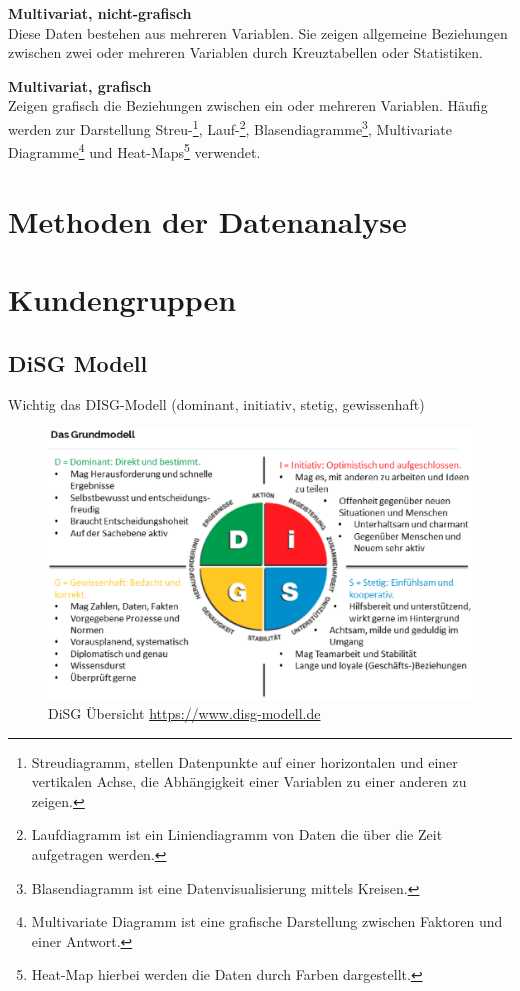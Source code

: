 \textbf{Multivariat, nicht-grafisch}\\
Diese Daten bestehen aus mehreren Variablen. Sie zeigen allgemeine Beziehungen zwischen zwei oder mehreren Variablen durch Kreuztabellen oder Statistiken.\vspace{0.2cm}
 
\textbf{Multivariat, grafisch}\\
Zeigen grafisch die Beziehungen zwischen ein oder mehreren Variablen. Häufig werden zur Darstellung Streu-\footnote{Streudiagramm, stellen Datenpunkte auf einer horizontalen und einer vertikalen Achse, die Abhängigkeit einer Variablen zu einer anderen zu zeigen.}, Lauf-\footnote{Laufdiagramm ist ein Liniendiagramm von Daten die über die Zeit aufgetragen werden.}, Blasendiagramme\footnote{Blasendiagramm ist eine Datenvisualisierung mittels Kreisen.}, Multivariate Diagramme\footnote{Multivariate Diagramm ist eine grafische Darstellung zwischen Faktoren und einer Antwort.} und Heat-Maps\footnote{Heat-Map hierbei werden die Daten durch Farben dargestellt.} verwendet.

\section{Methoden der Datenanalyse}

\section{Kundengruppen}

\subsection{DiSG Modell}
Wichtig das DISG-Modell (dominant, initiativ, stetig, gewissenhaft)

\begin{figure}[!ht]
	\centering
	\includegraphics[width=\linewidth]{images/chapter3/disg-uebersicht.eps}
	\caption{DiSG Übersicht \href{https://www.disg-modell.de/persoenlichkeitsorientiertes-lernen-mit-dem-disg-modell}{https://www.disg-modell.de}}
	\label{img:disg_overview}
\end{figure}

